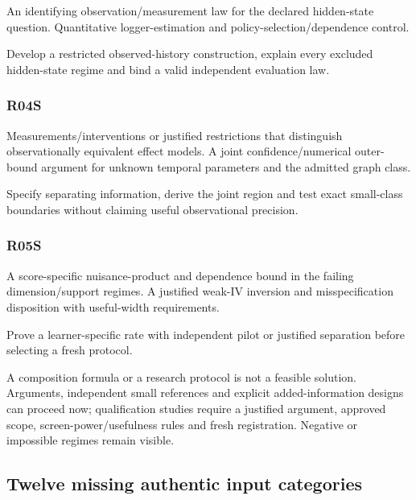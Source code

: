 \documentclass[
  10pt,
]{article}
\begin{document}
An identifying observation/measurement law for the declared hidden-state
question. Quantitative logger-estimation and policy-selection/dependence
control.

Develop a restricted observed-history construction, explain every
excluded hidden-state regime and bind a valid independent evaluation
law.

\hypertarget{r04s}{%
\subsubsection{R04S}\label{r04s}}

Measurements/interventions or justified restrictions that distinguish
observationally equivalent effect models. A joint confidence/numerical
outer-bound argument for unknown temporal parameters and the admitted
graph class.

Specify separating information, derive the joint region and test exact
small-class boundaries without claiming useful observational precision.

\hypertarget{r05s}{%
\subsubsection{R05S}\label{r05s}}

A score-specific nuisance-product and dependence bound in the failing
dimension/support regimes. A justified weak-IV inversion and
misspecification disposition with useful-width requirements.

Prove a learner-specific rate with independent pilot or justified
separation before selecting a fresh protocol.

A composition formula or a research protocol is not a feasible solution.
Arguments, independent small references and explicit added-information
designs can proceed now; qualification studies require a justified
argument, approved scope, screen-power/usefulness rules and fresh
registration. Negative or impossible regimes remain visible.

\hypertarget{twelve-missing-authentic-input-categories}{%
\subsection{Twelve missing authentic input
categories}\label{twelve-missing-authentic-input-categories}}
\end{document}
